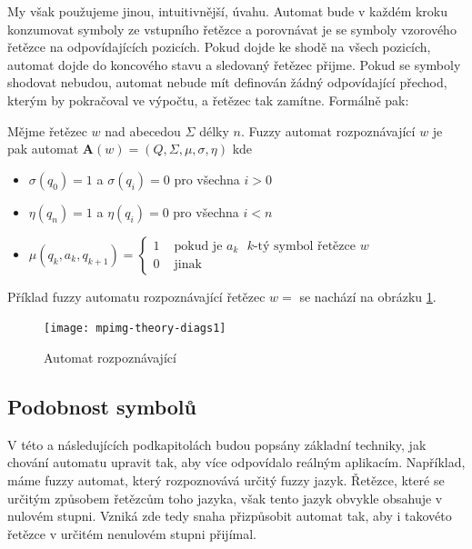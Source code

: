 \documentclass[a4paper,10pt]{article}
\begin{document}
My však použujeme jinou, intuitivnější, úvahu. Automat bude v každém kroku konzumovat symboly ze vstupního řetězce a porovnávat je se symboly vzorového řetězce na odpovídajících pozicích. Pokud dojde ke shodě na všech pozicích, automat dojde do koncového stavu a sledovaný řetězec přijme. Pokud se symboly shodovat nebudou, automat nebude mít definován žádný odpovídající přechod, kterým by pokračoval ve výpočtu, a řetězec tak zamítne. Formálně pak:

\begin{definition} \label{def-FuzzAutRozpOme}
  Mějme řetězec $w$ nad abecedou $\Sigma$ délky $n$. Fuzzy automat rozpoznávající $w$ je pak automat $\mathbf{A}(w) = ( Q, \Sigma, \mu, \sigma, \eta )$ kde
  \begin{itemize}
   \item $\sigma(q_0) = 1$ a $\sigma(q_i) = 0$ pro všechna $i > 0$
   \item $\eta(q_n) = 1$ a $\eta(q_i) = 0$ pro všechna $i < n$
   \item $\mu(q_{k}, a_k, q_{k+1}) = 
      \begin{cases}
	1		& \text{ pokud je $a_k$ $k$-tý symbol řetězce $w$} \\
	0		& \text{ jinak}
      \end{cases}
      $
  \end{itemize}
\end{definition}

\begin{example}
 Příklad fuzzy automatu rozpoznávající řetězec $w = $  se nachází na obrázku \ref{diag-AutRozpHell}.   

  \begin{figure}
    \texttt{[image: mpimg-theory-diags1]}
    \caption{Automat rozpoznávající } \label{diag-AutRozpHell} 
  \end{figure}
\end{example}

\subsection{Podobnost symbolů}
V této a následujících podkapitolách budou popsány základní techniky, jak chování automatu upravit tak, aby více odpovídalo reálným aplikacím. Například, máme fuzzy automat, který rozpoznovává určitý fuzzy jazyk. Řetězce, které se určitým způsobem  řetězcům toho jazyka, však tento jazyk obvykle obsahuje v nulovém stupni. Vzniká zde tedy snaha přizpůsobit automat tak, aby i takovéto řetězce v určitém nenulovém stupni přijímal.
\end{document}
